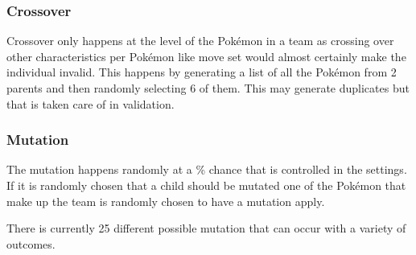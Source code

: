 \documentclass[a4paper]{article}
\newcommand{\Pokemon}{Pok\'{e}mon}
\begin{document}
\subsubsection{Crossover}
\par
Crossover only happens at the level of the \Pokemon{} in a team as crossing over other characteristics per \Pokemon{} like move set would almost certainly make the individual invalid.
This happens by generating a list of all the \Pokemon{} from 2 parents and then randomly selecting 6 of them.
This may generate duplicates but that is taken care of in validation.
\subsubsection{Mutation}
\par
The mutation happens randomly at a \% chance that is controlled in the settings.
If it is randomly chosen that a child should be mutated one of the \Pokemon{} that make up the team is randomly chosen to have a mutation apply.
\par
There is currently 25 different possible mutation that can occur with a variety of outcomes.
\end{document}
